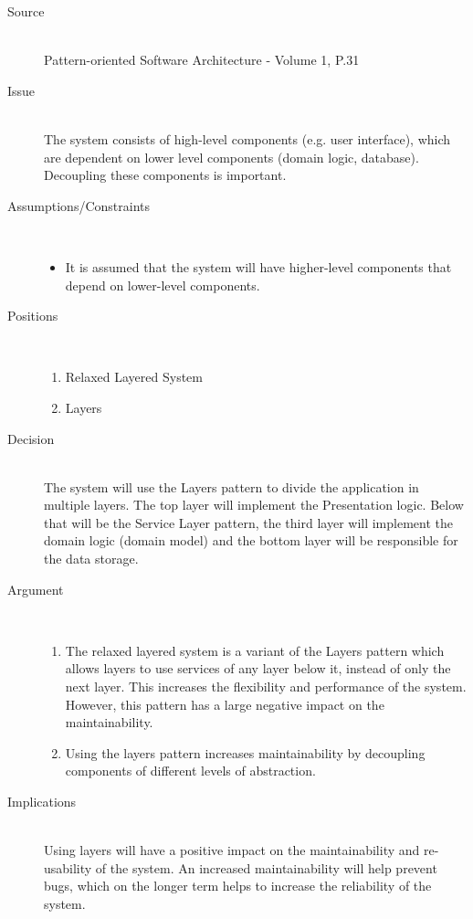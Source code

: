 \begin{description}
\item [Source]~\\
Pattern-oriented Software Architecture - Volume 1, P.31 \cite{wiley-1}

\item [Issue]~\\
The system consists of high-level components (e.g. user interface), which are dependent on lower level components (domain logic, database). Decoupling these components is important.

\item [Assumptions/Constraints]~
\begin{itemize}
\item It is assumed that the system will have higher-level components that depend on lower-level components.
\end{itemize}

\item [Positions]~
\begin{enumerate}
\item Relaxed Layered System
\item Layers
\end{enumerate}

\item [Decision] ~\\
The system will use the Layers pattern to divide the application in multiple layers. The top layer will implement the Presentation logic. Below that will be the Service Layer pattern, the third layer will implement the domain logic (domain model) and the bottom layer will be responsible for the data storage.

\item [Argument]~
\begin{enumerate}
\item The relaxed layered system is a variant of the Layers pattern which allows layers to use services of any layer below it, instead of only the next layer. This increases the flexibility and performance of the system. However, this pattern has a large negative impact on the maintainability.

\item 
Using the layers pattern increases maintainability by decoupling components of different levels of abstraction.

\end{enumerate}

\item [Implications]~\\
Using layers will have a positive impact on the maintainability and re-usability of the system. An increased maintainability will help prevent bugs, which on the longer term helps to increase the reliability of the system. 


\end{description}
